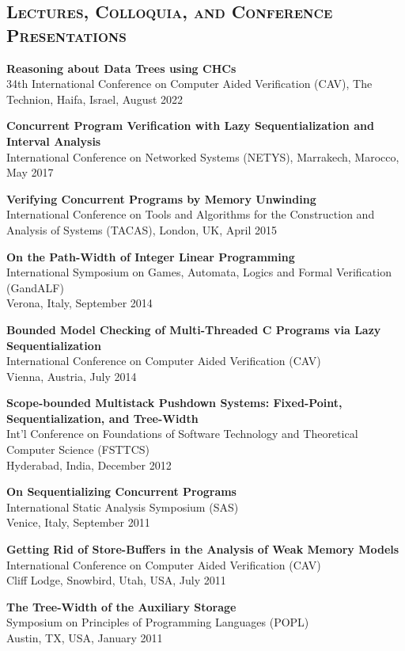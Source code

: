 \begin{resume}
\section{\bfseries \scshape  Lectures, Colloquia, and Conference Presentations}

{\bf  Reasoning about Data Trees using CHCs}\\
34th International Conference on Computer Aided Verification (CAV),
The Technion, Haifa, Israel, August 2022

{\bf  Concurrent Program Verification with Lazy Sequentialization and Interval Analysis}\\
International Conference on Networked Systems (NETYS),
Marrakech, Marocco, May 2017


{\bf  Verifying Concurrent Programs by Memory Unwinding}\\
International Conference on Tools and Algorithms for the Construction and Analysis of Systems (TACAS),
London, UK, April 2015

{\bf On the Path-Width of Integer Linear Programming}\\
International Symposium on Games, Automata, Logics and Formal Verification (GandALF)\\
Verona, Italy, September 2014


{\bf Bounded Model Checking of Multi-Threaded C Programs via Lazy Sequentialization}\\
International Conference on Computer Aided Verification (CAV)\\
Vienna, Austria, July 2014


{\bf Scope-bounded Multistack Pushdown Systems:  Fixed-Point, Sequentialization, and Tree-Width}\\
Int'l Conference on Foundations of Software Technology and Theoretical Computer Science (FSTTCS)\\
Hyderabad, India, December 2012

{\bf On Sequentializing Concurrent Programs}\\
International Static Analysis Symposium (SAS)\\
Venice, Italy, September 2011

{\bf Getting Rid of Store-Buffers in the Analysis of Weak Memory Models}\\
International Conference on Computer Aided Verification (CAV)\\
Cliff Lodge, Snowbird, Utah, USA, July 2011


{\bf The Tree-Width of the Auxiliary Storage}\\
Symposium on Principles of Programming Languages (POPL)\\
Austin, TX, USA, January 2011



\end{resume}
